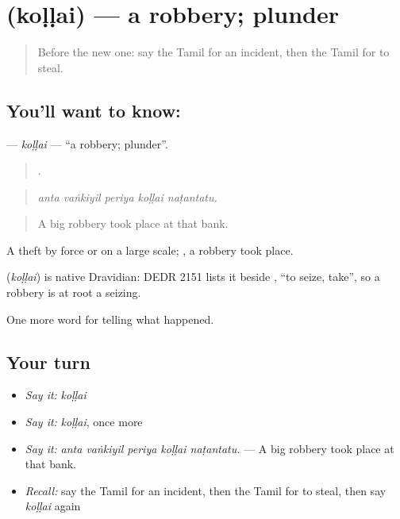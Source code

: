 \section[\texorpdfstring{\ta{கொள்ளை} (koḷḷai)}{கொள்ளை (koḷḷai)}]{ (koḷḷai) — a robbery; plunder}

\label{lesson:TA-C294-kollai}



\begin{quote}
Before the new one: say the Tamil for an incident, then the Tamil for to steal.
\end{quote}

\subsection*{You'll want to know: }
\textbf{} — \emph{koḷḷai} — \textquotedblleft{}a robbery; plunder\textquotedblright{}.

\begin{quote}
    .
\end{quote}

\begin{quote}
\emph{anta vaṅkiyil periya koḷḷai naṭantatu.}
\end{quote}

\begin{quote}
A big robbery took place at that bank.
\end{quote}

A theft by force or on a large scale;  , a robbery took place.

\begin{cousinweb}
\textbf{} (\emph{koḷḷai}) is native Dravidian: DEDR 2151 lists it beside , \textquotedblleft{}to seize, take\textquotedblright{}, so a robbery is at root a seizing.
\end{cousinweb}

\begin{grammarlens}[title={What you've built}]
One more word for telling what happened.
\end{grammarlens}

\subsection*{Your turn}
\begin{itemize}
\raggedright
  \item \emph{Say it:} \emph{koḷḷai}
  \item \emph{Say it:} \emph{koḷḷai}, once more
  \item \emph{Say it:} \emph{anta vaṅkiyil periya koḷḷai naṭantatu.} — A big robbery took place at that bank.
  \item \emph{Recall:} say the Tamil for an incident, then the Tamil for to steal, then say \emph{koḷḷai} again
\end{itemize}

